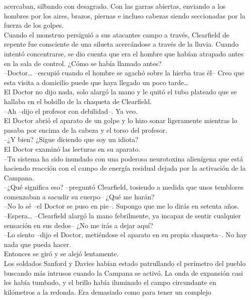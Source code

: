 acercaban, silbando con desagrado. Con las garras abiertas, enviando a
los hombres por los aires, brazos, piernas e incluso cabezas siendo
seccionadas por la fuerza de los golpes.\\
Cuando el monstruo persiguió a sus atacantes campo a través, Clearfield
de repente fue consciente de una silueta acercándose a través de la
lluvia. Cuando intentó concentrarse, se dio cuenta que era el hombre que
habían atrapado antes en la sala de control. ¿Cómo se había llamado
antes?\\
--Doctor\ldots{} --escupió cuando el hombre se agachó sobre la hierba
tras él-- Creo que esta visita a domicilio puede que haya llegado un
poco tarde\ldots{}\\
El Doctor no dijo nada, solo alargó la mano y le quitó el tubo plateado
que se hallaba en el bolsillo de la chaqueta de Clearfield.\\
--Ah --dijo el profesor con debilidad--. Ya veo.\\
El Doctor abrió el aparato de un golpe y lo hizo sonar ligeramente
mientras lo pasaba por encima de la cabeza y el torso del profesor.\\
--¿Y bien? ¿Sigue diciendo que soy un idiota?\\
El Doctor examinó las lecturas en su aparato.\\
--Tu sistema ha sido inundado con una poderosa neurotoxina alienígena
que está haciendo reacción con el campo de energía residual dejada por
la activación de la Campana.\\
--¿Qué significa eso? --preguntó Clearfield, tosiendo a medida que unos
temblores comenzaban a sacudir su cuerpo-- ¿Qué me harán?\\
--No lo sé --el Doctor se puso en pie--. Supongo que me lo dirás en
setenta años.\\
--Espera\ldots{} --Clearfield alargó la mano febrilmente, ya incapaz de
sentir cualquier sensación en sus dedos-- ¿No me irás a dejar aquí?\\
--Lo siento --dijo el Doctor, metiéndose el aparato en su propia
chaqueta--. No hay nada que pueda hacer.\\
Entonces se giró y se alejó lentamente.\\[2\baselineskip]Los soldados
Sanford y Davies habían estado patrullando el perímetro del pueblo
buscando más intrusos cuando la Campana se activó. La onda de expansión
casi les había tumbado, y el brillo había iluminado el campo circundante
en kilómetros a la redonda. Era demasiado como para tener un complejo
